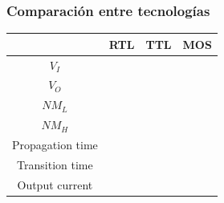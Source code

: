\subsubsection{Comparación entre tecnologías}
\begin{table}[H]
	\centering
	\begin{tabular}{|c|c|c|c|}
		\hline
		\diagbox{Parámetros}{Tecnologías} & RTL	& TTL & MOS\\
		\hline
		$V_I$ & & & \\
		\hline
		$V_O$ & & & \\
		\hline
		$NM_{L}$ & & & \\
		\hline
		$NM_{H}$ & & & \\
		\hline
		Propagation time & & & \\
		\hline
		Transition time & & & \\
		\hline
		Output current & & & \\
		\hline
	\end{tabular}
\end{table}